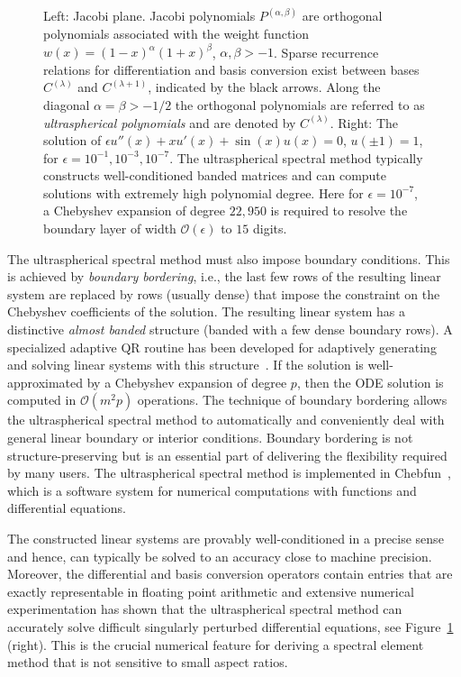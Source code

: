 \documentclass[review]{siamart171218}
\begin{document}
\begin{figure}
\begin{minipage}{.49\textwidth}
\end{minipage}
  \caption{Left: Jacobi plane. Jacobi polynomials $P^{(\alpha,\beta)}$ are orthogonal polynomials associated with the weight function $w(x) = (1-x)^\alpha(1+x)^\beta$, $\alpha,\beta>-1$. Sparse recurrence relations for differentiation and basis conversion exist between bases $C^{(\lambda)}$ and $C^{(\lambda+1)}$, indicated by the black arrows. Along the diagonal $\alpha=\beta>-1/2$ the orthogonal polynomials are referred to as {\em ultraspherical polynomials} and are denoted by $C^{(\lambda)}$. Right: The solution of $\epsilon u''(x) + xu'(x)+\sin(x)u(x) = 0$, $u(\pm 1) = 1$, for $\epsilon = 10^{-1}, 10^{-3}, 10^{-7}$. The ultraspherical spectral method typically constructs well-conditioned banded matrices and can compute solutions with extremely high polynomial degree. Here for $\epsilon=10^{-7}$, a Chebyshev expansion of degree $22,\!950$ is required to resolve the boundary layer of width $\mathcal{O}(\epsilon)$ to $15$ digits.}
  \label{fig:JacobiPlane}
\end{figure}

The ultraspherical spectral method must also impose boundary conditions. This is achieved by {\em boundary bordering}, i.e., the last few rows of the resulting linear system are replaced by rows (usually dense) that impose the constraint on the Chebyshev coefficients of the solution. The resulting linear system has a distinctive {\em almost banded} structure (banded with a few dense boundary rows). A specialized adaptive QR routine has been developed for adaptively generating and solving linear systems with this structure~\cite{Olver_13_01}. If the solution is well-approximated by a Chebyshev expansion of degree $p$, then the ODE solution is computed in $\mathcal{O}(m^2p)$ operations. The technique of boundary bordering allows the ultraspherical spectral method to automatically and conveniently deal with general linear boundary or interior conditions. Boundary bordering is not structure-preserving but is an essential part of delivering the flexibility required by many users. The ultraspherical spectral method is implemented in Chebfun~\cite{Chebfun}, which is a software system for numerical computations with functions and differential equations.  

The constructed linear systems are provably well-conditioned in a precise sense~\cite[Lem.~4.4]{Olver_13_01} and hence, can typically be solved to an accuracy close to machine precision. Moreover, the differential and basis conversion operators contain entries that are exactly representable in floating point arithmetic and extensive numerical experimentation has shown that the ultraspherical spectral method can accurately solve difficult singularly perturbed differential equations, see Figure~\ref{fig:JacobiPlane} (right). This is the crucial 
numerical feature for deriving a spectral element method that is not sensitive to small aspect ratios.
\end{document}
